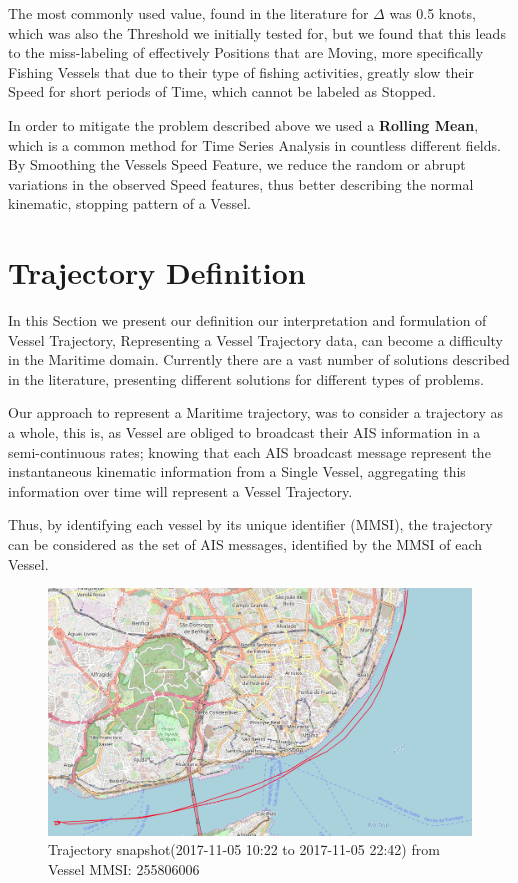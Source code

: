 The most commonly used value, found in the literature for $\Delta$ was 0.5 knots, which was also the Threshold we initially tested for, but we found that this leads to the miss-labeling of effectively Positions that are Moving, more specifically Fishing Vessels that due to their type of fishing activities, greatly slow their Speed for short periods of Time, which cannot be labeled as Stopped.

In order to mitigate the problem described above we used a \textbf{Rolling Mean}, which is a common method for Time Series Analysis in countless different fields.  By Smoothing the Vessels Speed Feature, we reduce the random or abrupt variations in the observed Speed features,  thus better describing the normal kinematic, stopping  pattern of a Vessel. 

\section{Trajectory Definition}
In this Section we present our definition our interpretation and formulation of Vessel Trajectory, 
Representing a Vessel Trajectory data, can become a difficulty in the Maritime domain. Currently there are a vast number of solutions described in the literature, presenting different solutions for different types of problems. 

Our approach to represent a Maritime trajectory, was to consider a trajectory as a whole, this is, as Vessel are obliged to broadcast their AIS information in a semi-continuous rates; knowing that each AIS broadcast message represent the instantaneous kinematic information from a Single Vessel, aggregating this information over time will represent a Vessel Trajectory. 

Thus, by identifying each vessel by its unique identifier (MMSI), the trajectory can be considered as the set of AIS messages, identified by the MMSI of each Vessel.

\begin{figure}[H]
	\centering
	\includegraphics[scale = .3]{figures/Ch3/traj_example.png}
    \caption{Trajectory snapshot(2017-11-05 10:22 to 2017-11-05 22:42) from Vessel MMSI: 255806006}
    \label{fig: TrajectorySMM_example}
\end{figure}

